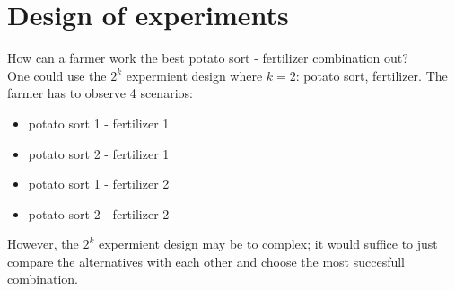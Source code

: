 \section{Design of experiments}
How can a farmer work the best potato sort - fertilizer combination out?\\
One could use the $2^k $ expermient design where $k=2$: potato sort, fertilizer.
The farmer has to observe 4 scenarios:
\begin{itemize}
 \item potato sort 1 - fertilizer 1
\item potato sort 2 - fertilizer 1
\item potato sort 1 - fertilizer 2
\item potato sort 2 - fertilizer 2
\end{itemize}
However, the $2^k$ expermient design may be to complex; it would suffice to just compare the alternatives with
each other and choose the most succesfull combination.   